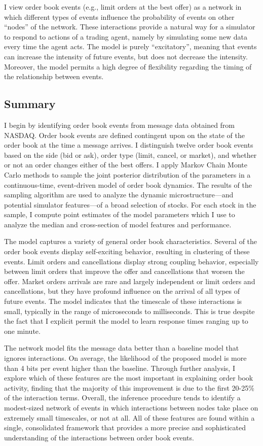 	I view order book events (e.g., limit orders at the best offer) as a network in which different types of events influence the probability of events on other ``nodes'' of the network. These interactions provide a natural way for a simulator to respond to actions of a trading agent, namely by simulating some new data every time the agent acts. The model is purely ``excitatory'', meaning that events can increase the intensity of future events, but does not decrease the intensity. Moreover, the model permits a high degree of flexibility regarding the timing of the relationship between events.

	\subsection{Summary}
		I begin by identifying order book events from message data obtained from NASDAQ. Order book events are defined contingent upon on the state of the order book at the time a message arrives. I distinguish twelve order book events based on the side (bid or ask), order type (limit, cancel, or market), and whether or not an order changes either of the best offers. I apply Markov Chain Monte Carlo methods to sample the joint posterior distribution of the parameters in a continuous-time, event-driven model of order book dynamics. The results of the sampling algorithm are used to analyze the dynamic microstructure---and potential simulator features---of a broad selection of stocks. For each stock in the sample, I compute point estimates of the model parameters which I use to analyze the median and cross-section of model features and performance.

		The model captures a variety of general order book characteristics. Several of the order book events display self-exciting behavior, resulting in clustering of these events. Limit orders and cancellations display strong coupling behavior, especially between limit orders that improve the offer and cancellations that worsen the offer. Market orders arrivals are rare and largely independent or limit orders and cancellations, but they have profound influence on the arrival of all types of future events. The model indicates that the timescale of these interactions is small, typically in the range of microseconds to milliseconds. This is true despite the fact that I explicit permit the model to learn response times ranging up to one minute.

		The network model fits the message data better than a baseline model that ignores interactions. On average, the likelihood of the proposed model is more than 4 bits per event higher than the baseline. Through further analysis, I explore which of these features are the most important in explaining order book activity, finding that the majority of this improvement is due to the first 20-25\% of the interaction terms. Overall, the inference procedure tends to identify a modest-sized network of events in which interactions between nodes take place on extremely small timescales, or not at all. All of these features are found within a single, consolidated framework that provides a more precise and sophisticated understanding of the interactions between order book events.

